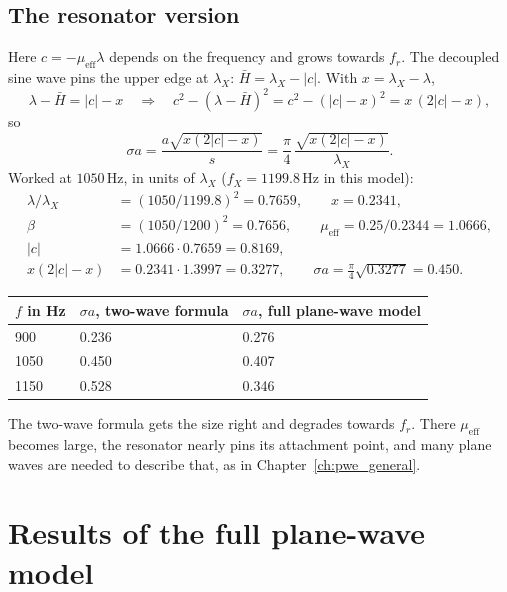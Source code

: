 \subsection{The resonator version}
Here $c = -\mu_\mathrm{eff}\lambda$ depends on the frequency and grows towards $f_r$.
The decoupled sine wave pins the upper edge at $\lambda_X$:
$\bar{H} = \lambda_X - |c|$. With $x = \lambda_X - \lambda$,
\begin{equation}
  \lambda - \bar{H} = |c| - x
  \quad\Rightarrow\quad
  c^2 - (\lambda - \bar{H})^2 = c^2 - (|c| - x)^2 = x\,(2|c| - x),
\end{equation}
so
\begin{equation}
  \sigma a = \frac{a\sqrt{x(2|c| - x)}}{s} = \frac{\pi}{4}\,\frac{\sqrt{x(2|c| - x)}}{\lambda_X} .
\end{equation}
Worked at $1050\,\mathrm{Hz}$, in units of $\lambda_X$ ($f_X = 1199.8\,\mathrm{Hz}$
in this model):
\begin{align}
  \lambda/\lambda_X &= (1050/1199.8)^2 = 0.7659, \qquad x = 0.2341, \\
  \beta &= (1050/1200)^2 = 0.7656, \qquad \mu_\mathrm{eff} = 0.25/0.2344 = 1.0666, \\
  |c| &= 1.0666\cdot 0.7659 = 0.8169, \\
  x(2|c| - x) &= 0.2341\cdot 1.3997 = 0.3277, \qquad \sigma a = \tfrac{\pi}{4}\sqrt{0.3277} = 0.450 .
\end{align}

\begin{center}
\begin{tabular}{|l|l|l|}
\hline
$f$ in Hz & $\sigma a$, two-wave formula & $\sigma a$, full plane-wave model \\
\hline
900 & 0.236 & 0.276 \\
1050 & 0.450 & 0.407 \\
1150 & 0.528 & 0.346 \\
\hline
\end{tabular}
\end{center}

The two-wave formula gets the size right and degrades towards $f_r$. There
$\mu_\mathrm{eff}$ becomes large, the resonator nearly pins its attachment point, and
many plane waves are needed to describe that, as in Chapter~\ref{ch:pwe_general}.

\section{Results of the full plane-wave model}


